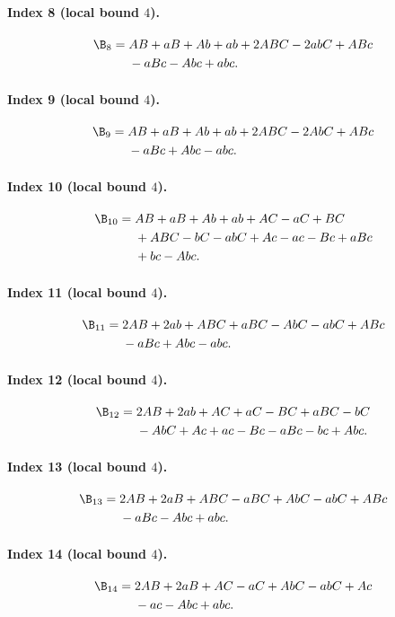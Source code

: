 \paragraph{Index 8 (local bound $4$).}
\begin{align*}
\B_{8}={}&AB +aB +Ab +ab +2ABC -2abC +ABc\\
&{}-aBc -Abc +abc.
\end{align*}
\paragraph{Index 9 (local bound $4$).}
\begin{align*}
\B_{9}={}&AB +aB +Ab +ab +2ABC -2AbC +ABc\\
&{}-aBc +Abc -abc.
\end{align*}
\paragraph{Index 10 (local bound $4$).}
\begin{align*}
\B_{10}={}&AB +aB +Ab +ab +AC -aC +BC\\
&{}+ABC -bC -abC +Ac -ac -Bc +aBc\\
&{}+bc -Abc.
\end{align*}
\paragraph{Index 11 (local bound $4$).}
\begin{align*}
\B_{11}={}&2AB +2ab +ABC +aBC -AbC -abC +ABc\\
&{}-aBc +Abc -abc.
\end{align*}
\paragraph{Index 12 (local bound $4$).}
\begin{align*}
\B_{12}={}&2AB +2ab +AC +aC -BC +aBC -bC\\
&{}-AbC +Ac +ac -Bc -aBc -bc +Abc.
\end{align*}
\paragraph{Index 13 (local bound $4$).}
\begin{align*}
\B_{13}={}&2AB +2aB +ABC -aBC +AbC -abC +ABc\\
&{}-aBc -Abc +abc.
\end{align*}
\paragraph{Index 14 (local bound $4$).}
\begin{align*}
\B_{14}={}&2AB +2aB +AC -aC +AbC -abC +Ac\\
&{}-ac -Abc +abc.
\end{align*}
